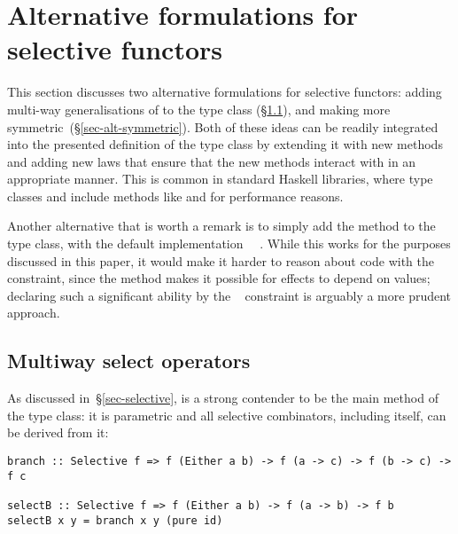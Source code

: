 \section{Alternative formulations for selective functors}
\label{sec-alternatives}

This section discusses two alternative formulations for selective functors:
adding multi-way generalisations of  to the  type
class (\S\ref{sec-alt-multi}), and making  more
symmetric~(\S\ref{sec-alt-symmetric}). Both of these ideas can be readily
integrated into the presented definition of the  type class by
extending it with new methods and adding new laws that ensure that the
new methods interact with  in an appropriate manner. This is common
in standard Haskell libraries, where type classes  and
 include methods like \hs{*>} and \hs{>>} for performance reasons.


Another alternative that is worth a remark is to simply add the 
method to the  type class, with the default implementation
~\hs{=}~. While this works for the purposes discussed in
this paper, it would make it harder to reason about code with the
~ constraint, since the  method makes it
possible for effects to depend on values; declaring such a significant ability
by the ~ constraint is arguably a more prudent approach.

\subsection{Multiway select operators}\label{sec-alt-multi}

As discussed in~\S\ref{sec-selective},  is a strong contender to be
the main method of the  type class: it is parametric and all
selective combinators, including  itself, can be derived from it:

\vspace{1mm}
\begin{verbatim}
branch :: Selective f => f (Either a b) -> f (a -> c) -> f (b -> c) -> f c

selectB :: Selective f => f (Either a b) -> f (a -> b) -> f b
selectB x y = branch x y (pure id)
\end{verbatim}
\vspace{1mm}

